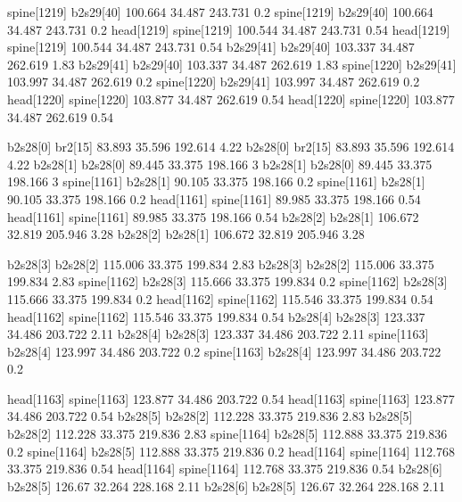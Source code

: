spine[1219]    b2s29[40]    100.664    34.487    243.731    0.2
spine[1219]    b2s29[40]    100.664    34.487    243.731    0.2
head[1219]    spine[1219]    100.544    34.487    243.731    0.54
head[1219]    spine[1219]    100.544    34.487    243.731    0.54
b2s29[41]    b2s29[40]    103.337    34.487    262.619    1.83
b2s29[41]    b2s29[40]    103.337    34.487    262.619    1.83
spine[1220]    b2s29[41]    103.997    34.487    262.619    0.2
spine[1220]    b2s29[41]    103.997    34.487    262.619    0.2
head[1220]    spine[1220]    103.877    34.487    262.619    0.54
head[1220]    spine[1220]    103.877    34.487    262.619    0.54


b2s28[0]    br2[15]    83.893    35.596    192.614    4.22
b2s28[0]    br2[15]    83.893    35.596    192.614    4.22
b2s28[1]    b2s28[0]    89.445    33.375    198.166    3
b2s28[1]    b2s28[0]    89.445    33.375    198.166    3
spine[1161]    b2s28[1]    90.105    33.375    198.166    0.2
spine[1161]    b2s28[1]    90.105    33.375    198.166    0.2
head[1161]    spine[1161]    89.985    33.375    198.166    0.54
head[1161]    spine[1161]    89.985    33.375    198.166    0.54
b2s28[2]    b2s28[1]    106.672    32.819    205.946    3.28
b2s28[2]    b2s28[1]    106.672    32.819    205.946    3.28


b2s28[3]    b2s28[2]    115.006    33.375    199.834    2.83
b2s28[3]    b2s28[2]    115.006    33.375    199.834    2.83
spine[1162]    b2s28[3]    115.666    33.375    199.834    0.2
spine[1162]    b2s28[3]    115.666    33.375    199.834    0.2
head[1162]    spine[1162]    115.546    33.375    199.834    0.54
head[1162]    spine[1162]    115.546    33.375    199.834    0.54
b2s28[4]    b2s28[3]    123.337    34.486    203.722    2.11
b2s28[4]    b2s28[3]    123.337    34.486    203.722    2.11
spine[1163]    b2s28[4]    123.997    34.486    203.722    0.2
spine[1163]    b2s28[4]    123.997    34.486    203.722    0.2


head[1163]    spine[1163]    123.877    34.486    203.722    0.54
head[1163]    spine[1163]    123.877    34.486    203.722    0.54
b2s28[5]    b2s28[2]    112.228    33.375    219.836    2.83
b2s28[5]    b2s28[2]    112.228    33.375    219.836    2.83
spine[1164]    b2s28[5]    112.888    33.375    219.836    0.2
spine[1164]    b2s28[5]    112.888    33.375    219.836    0.2
head[1164]    spine[1164]    112.768    33.375    219.836    0.54
head[1164]    spine[1164]    112.768    33.375    219.836    0.54
b2s28[6]    b2s28[5]    126.67    32.264    228.168    2.11
b2s28[6]    b2s28[5]    126.67    32.264    228.168    2.11


